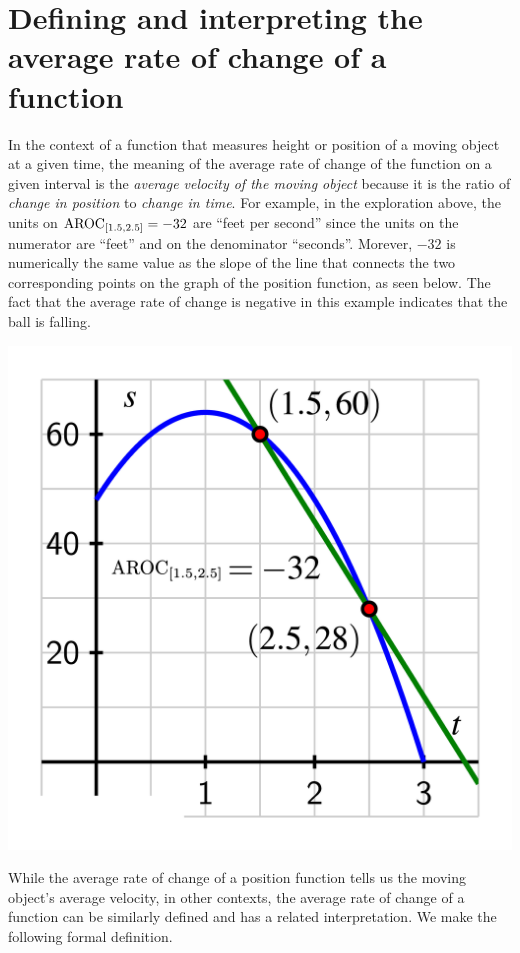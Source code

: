 \documentclass[nooutcomes]{ximera}
\begin{document}

\section{Defining and interpreting the average rate of change of a function}

In the context of a function that measures height or position of a moving object at a given time, the meaning of the average rate of change of the function on a given interval is the \emph{average velocity of the moving object} because it is the ratio of \emph{change in position} to \emph{change in time}.  For example, in the exploration above, the units on $\mathrm{AROC}_{[1.5,2.5]} = -32$ are ``feet per second'' since the units on the numerator are ``feet'' and on the denominator ``seconds''.  Morever, $-32$ is numerically the same value as the slope of the line that connects the two corresponding points on the graph of the position function, as seen below.  The fact that the average rate of change is negative in this example indicates that the ball is falling.

\begin{image}
\includegraphics[width=.7\textwidth]{aroc-s-t-ex-1.jpg}
\end{image}

While the average rate of change of a position function tells us the moving object's average velocity, in other contexts, the average rate of change of a function can be similarly defined and has a related interpretation.  We make the following formal definition.
\end{document}
